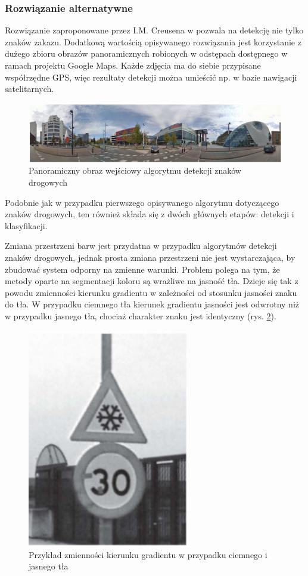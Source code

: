 \subsubsection{Rozwiązanie alternatywne}
Rozwiązanie zaproponowane przez I.M. Creusena w \cite{T7} pozwala na detekcję nie tylko znaków zakazu. Dodatkową wartością opisywanego rozwiązania jest korzystanie z dużego zbioru obrazów panoramicznych robionych w odstępach dostępnego w ramach projektu Google Maps. Każde zdjęcia ma do siebie przypisane współrzędne GPS, więc rezultaty detekcji można umieścić np. w bazie nawigacji satelitarnych.

\begin{figure}
  \centering
  \includegraphics[width=13cm]{img/sign_detection2_input.png}
  \caption{Panoramiczny obraz wejściowy algorytmu detekcji znaków drogowych\cite{T7}}
  \label{fig:sign_detection2_input}
\end{figure}

Podobnie jak w przypadku pierwszego opisywanego algorytmu dotyczącego znaków drogowych, ten również składa się z dwóch głównych etapów: detekcji i klasyfikacji.

Zmiana przestrzeni barw jest przydatna w przypadku algorytmów detekcji znaków drogowych, jednak prosta zmiana przestrzeni nie jest wystarczająca, by zbudować system odporny na zmienne warunki. Problem polega na tym, że metody oparte na segmentacji koloru są wrażliwe na jasność tła. Dzieje się tak z powodu zmienności kierunku gradientu w zależności od stosunku jasności znaku do tła. W przypadku ciemnego tła kierunek gradientu jasności jest odwrotny niż w przypadku jasnego tła, chociaż charakter znaku jest identyczny (rys. \ref{fig:sign_detection2_example}).

\begin{figure}
  \centering
  \includegraphics[width=7cm]{img/sign_detection2_example.png}
  \caption{Przykład zmienności kierunku gradientu w przypadku ciemnego i jasnego tła\cite{T7}}
  \label{fig:sign_detection2_example}
\end{figure}

